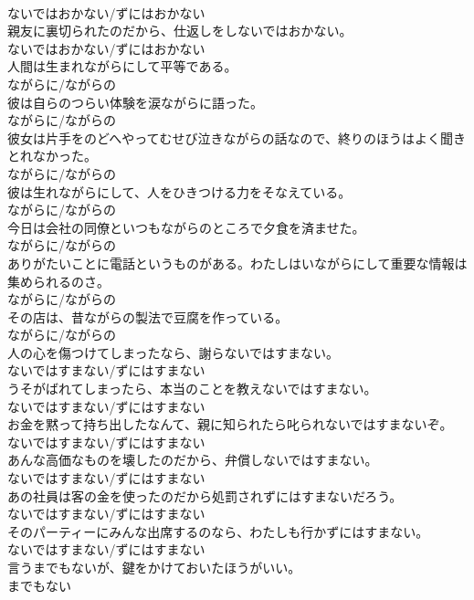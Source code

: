\documentclass[8pt]{extreport}
\begin{document}
\begin{CJK}{UTF8}{min}
\\	ないではおかない/ずにはおかない
\\	親友に裏切られたのだから、仕返しをしないではおかない。	
\\	ないではおかない/ずにはおかない
\\	人間は生まれながらにして平等である。	
\\	ながらに/ながらの
\\	彼は自らのつらい体験を涙ながらに語った。	
\\	ながらに/ながらの
\\	彼女は片手をのどへやってむせび泣きながらの話なので、終りのほうはよく聞きとれなかった。	
\\	ながらに/ながらの
\\	彼は生れながらにして、人をひきつける力をそなえている。	
\\	ながらに/ながらの
\\	今日は会社の同僚といつもながらのところで夕食を済ませた。	
\\	ながらに/ながらの
\\	ありがたいことに電話というものがある。わたしはいながらにして重要な情報は集められるのさ。	
\\	ながらに/ながらの
\\	その店は、昔ながらの製法で豆腐を作っている。	
\\	ながらに/ながらの
\\	人の心を傷つけてしまったなら、謝らないではすまない。	
\\	ないではすまない/ずにはすまない
\\	うそがばれてしまったら、本当のことを教えないではすまない。	
\\	ないではすまない/ずにはすまない
\\	お金を黙って持ち出したなんて、親に知られたら叱られないではすまないぞ。	
\\	ないではすまない/ずにはすまない
\\	あんな高価なものを壊したのだから、弁償しないではすまない。	
\\	ないではすまない/ずにはすまない
\\	あの社員は客の金を使ったのだから処罰されずにはすまないだろう。	
\\	ないではすまない/ずにはすまない
\\	そのパーティーにみんな出席するのなら、わたしも行かずにはすまない。	
\\	ないではすまない/ずにはすまない
\\	言うまでもないが、鍵をかけておいたほうがいい。	
\\	までもない

\end{CJK}
\end{document}
